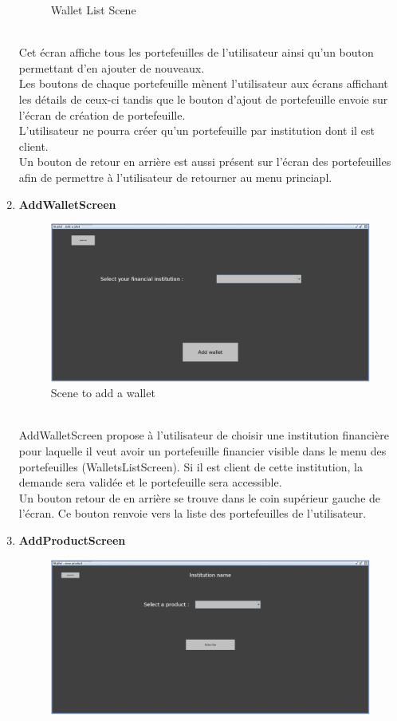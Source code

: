 \documentclass[../rapport.tex]{subfiles}
\begin{document}
\begin{enumerate}
\begin{figure}[h!]
				\caption{Wallet List Scene}
		\end{figure}
		\\
Cet écran affiche tous les portefeuilles de l'utilisateur ainsi qu'un bouton permettant d'en ajouter de nouveaux.\\
Les boutons de chaque portefeuille mènent l'utilisateur aux écrans affichant les détails de ceux-ci tandis que le bouton d'ajout de portefeuille envoie sur l'écran de création de portefeuille.\\
L'utilisateur ne pourra créer qu'un portefeuille par institution dont il est client.\\
Un bouton de retour en arrière est aussi présent sur l'écran des portefeuilles afin de permettre à l'utilisateur de retourner au menu princiapl.

\item \textbf{AddWalletScreen} \\
		\begin{figure}[h!]
				\centering \includegraphics[scale=0.2]{ressources/photos_diagrammes/app1/gui/addWallet.jpg}
				\caption{Scene to add a wallet}
		\end{figure}
		\\
AddWalletScreen propose à l'utilisateur de choisir une institution financière pour laquelle il veut avoir un portefeuille financier visible dans le menu des portefeuilles (WalletsListScreen). Si il est client de cette institution, la demande sera validée et le portefeuille sera accessible.\\
Un bouton retour de en arrière se trouve dans le coin supérieur gauche de l'écran. Ce bouton renvoie vers la liste des portefeuilles de l'utilisateur.
\newpage
\item \textbf{AddProductScreen}\\
	    \begin{figure}[h!]
			\centering \includegraphics[scale=0.2]{ressources/photos_diagrammes/app1/gui/addproduct.jpg}

\end{figure}
\end{enumerate}
\end{document}
